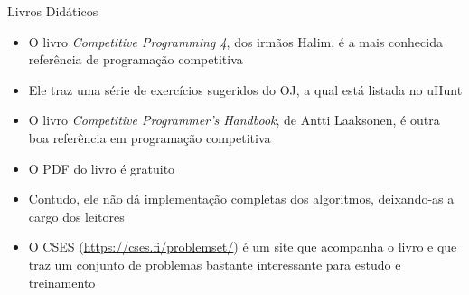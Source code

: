 \begin{frame}[fragile]{Livros Didáticos}

    \begin{itemize}
        \item O livro \textit{Competitive Programming 4}, dos irmãos Halim, é a mais conhecida
            referência de programação competitiva

        \item Ele traz uma série de exercícios sugeridos do OJ, a qual está listada no uHunt

        \item O livro \textit{Competitive Programmer's Handbook}, de Antti Laaksonen, é outra
            boa referência em programação competitiva

        \item O PDF do livro é gratuito

        \item Contudo, ele não dá implementação completas dos algoritmos, deixando-as a cargo
            dos leitores

        \item O CSES (\url{https://cses.fi/problemset/}) é um site que acompanha o livro e que traz um
            conjunto de problemas bastante interessante para estudo e treinamento
    \end{itemize}

\end{frame}
